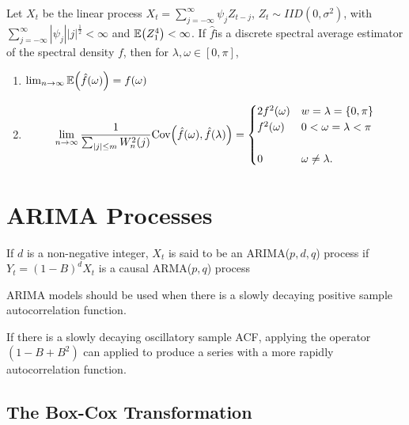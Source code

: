 \begin{thm}
  \label{sec:periodogram-5}
  Let $X_{t}$ be the linear process $X_{t} = \sum_{j=-\infty}^{\infty}
  \psi_{j} Z_{t-j}$, $Z_{t} \sim IID(0, \sigma^{2})$, with
  $\sum_{j=-\infty}^{\infty} |\psi_{j}| |j|^{\frac{1}{2}} < \infty$
  and $\E{Z_{1}^{4}} < \infty$.  If $\hat f$is a discrete spectral
  average estimator of the spectral density $f$, then for $\lambda,
  \omega \in [0, \pi]$,
  \begin{enumerate}
  \item $\lim_{n \rightarrow \infty} \E{\hat f(\omega)} = f(\omega)$
  \item
    \begin{align}
      \label{eq:76}
      \lim_{n \rightarrow \infty} \frac{1}{\sum_{|j| \leq m}^{}
        W_{n}^{2}(j)} \Cov{\hat f(\omega)}{\hat f(\lambda)} =
      \begin{cases}
        2 f^{2}(\omega) & w = \lambda = \{ 0, \pi \} \\
        f^{2}(\omega) & 0 < \omega = \lambda < \pi \\ \\
        0 & \omega \neq \lambda.
      \end{cases}
    \end{align}
  \end{enumerate}
\end{thm}

\section{ARIMA Processes}
\label{sec:arima-processes}

\begin{defn}
  \label{sec:arima-processes-1}
  If $d$ is a non-negative integer, $X_{t}$ is said to be an
  ARIMA($p,d,q$) process if $Y_{t} = (1 - B)^{d} X_{t}$ is a causal
  ARMA($p, q$) process
\end{defn}

\begin{thm}
  \label{sec:arima-processes-2}
  ARIMA models should be used when there is a slowly decaying positive
  sample autocorrelation function.

  If there is a slowly decaying oscillatory  sample ACF, applying
  the operator $(1 - B + B^{2})$ can applied to produce a series with
  a more rapidly autocorrelation function.
\end{thm}

\subsection{The Box-Cox Transformation}
\label{sec:box-cox-transf}

